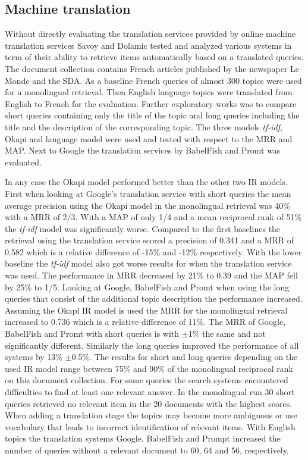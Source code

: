 \documentclass[journal]{IEEEtran}
\begin{document}
\subsection{Machine translation}
Without directly evaluating the translation services provided by online machine translation services Savoy and Dolamic \cite{savoy09} tested and analyzed various systems in term of their ability to retrieve items automatically based on a translated queries.
The document collection contains French articles published by the newspaper Le Monde and the SDA.
As a baseline French queries of almost 300 topics were used for a monolingual retrieval.
Then English language topics were translated from English to French for the evaluation.
Further exploratory works was to compare short queries containing only the title of the topic and long queries including the title and the description of the corresponding topic.
The three models \textit{tf-idf}, Okapi and language model were used and tested with respect to the MRR and MAP.
Next to Google the translation services by BabelFish and Promt was evaluated.

In any case the Okapi model performed better than the other two IR models.
First when looking at Google's translation service with short queries the mean average precision using the Okapi model in the monolingual retrieval was 40\% with a MRR of 2/3.
With a MAP of only 1/4 and a mean reciprocal rank of 51\% the \textit{tf-idf} model was significantly worse.
Compared to the first baselines the retrieval using the translation service scored a precision of 0.341 and a MRR of 0.582 which is a relative difference of -15\% and -12\% respectively.
With the lower baseline the \textit{tf-idf} model also got worse results for when the translation service was used.
The performance in MRR decreased by 21\% to 0.39 and the MAP fell by 25\% to 1/5.
Looking at Google, BabelFish and Promt when using the long queries that consist of the additional topic description the performance increased.
Assuming the Okapi IR model is used the MRR for the monolingual retrieval increased to 0.736 which is a relative difference of 11\%.
The MRR of Google, BabelFish and Promt with short queries is with $\pm$1\% the same and not significantly different.
Similarly the long queries improved the performance of all systems by 13\% $\pm$0.5\%.
The results for short and long queries depending on the used IR model range between 75\% and 90\% of the monolingual reciprocal rank on this document collection.
For some queries the search systems encountered difficulties to find at least one relevant answer.
In the monolingual run 30 short queries retrieved no relevant item in the 20 documents with the highest scores.
When adding a translation stage the topics may become more ambiguous or use vocabulary that leads to incorrect identification of relevant items.
With English topics the translation systems Google, BabelFish and Prompt increased the number of queries without a relevant document to 60, 64 and 56, respectively.
\end{document}
